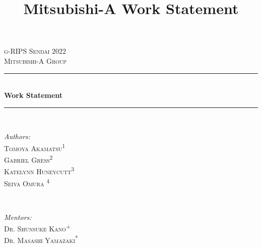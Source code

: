 \documentclass{article}
\title{Mitsubishi-A Work Statement}
\author{}
\date{}
\numberwithin{equation}{section}
\theoremstyle{definition}
\begin{document}
\nocite{*}%


\begin{titlepage}

\newcommand{\HRule}{\rule{\linewidth}{0.5mm}} %

\center %
 

\textsc{\LARGE g-RIPS Sendai 2022}\\[1.5cm] %
\textsc{\Large Mitsubishi-A Group}\\[0.5cm] %


\HRule \\[0.4cm]
{ \huge \bfseries Work Statement}\\[0.4cm] %
\HRule \\[1.5cm]
 

\begin{minipage}{0.4\textwidth}
\begin{flushleft} \large
\emph{Authors:}\\
 \textsc{Tomoya Akamatsu}\textsuperscript{1} \\ %
 \textsc{Gabriel Gress}\textsuperscript{2}\\
 \textsc{Katelynn Huneycutt}\textsuperscript{3}\\
  \textsc{Seiya Omura }\textsuperscript{4}\\
\end{flushleft}
\end{minipage}
~
\begin{minipage}{0.4\textwidth}
\begin{flushright} \large
\emph{Mentors:} \\
 \textsc{Dr. Shunsuke Kano}\textsuperscript{+}\\%
 \textsc{Dr. Masashi Yamazaki}\textsuperscript{*} 
\end{flushright}
\end{minipage}\\[0.5cm]
\center\begin{minipage}{0.35\textwidth}
\begin{flushleft}\small


\end{flushleft}
\end{minipage}
\end{titlepage}
\end{document}
